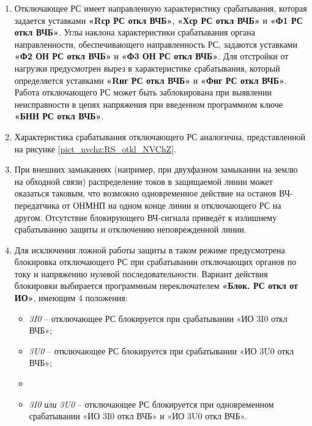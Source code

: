 \begin{enumerate}
\begin{enumerate}
\medskip

\item
Отключающее РС имеет направленную характеристику срабатывания, которая задается уставками \textbf{«Rср РС откл ВЧБ»}, \textbf{«Хср РС откл ВЧБ»} и \textbf{«Ф1 РС откл ВЧБ»}.
Углы наклона характеристики срабатывания органа направленности, обеспечивающего направленность РС, задаются уставками \textbf{«Ф2 ОН РС откл ВЧБ»} и \textbf{«Ф3 ОН РС откл ВЧБ»}.
Для отстройки от нагрузки предусмотрен вырез в характеристике срабатывания, который определяется уставками \textbf{«Rнг РС откл ВЧБ»} и \textbf{«Фнг РС откл ВЧБ»}. 
Работа отключающего РС может быть заблокирована при выявлении неисправности в цепях напряжения при введенном программном ключе \textbf{«БНН РС откл ВЧБ»}.

\item
Характеристика срабатывания отключающего РС аналогична, представленной на рисунке \ref{pict_nvchz:RS_otkl_NVChZ}.

%
%

\item
При внешних замыканиях (например, при двухфазном замыкании на землю на обходной связи) распределение токов в защищаемой линии может оказаться таковым, что возможно одновременное действие на останов ВЧ-передатчика от ОНМНП на одном конце линии и отключающего РС на другом.
Отсутствие блокирующего ВЧ-сигнала приведёт к излишнему срабатыванию защиты и отключению неповрежденной линии. 

\item
Для исключения ложной работы защиты в таком режиме предусмотрена блокировка отключающего РС при срабатывании отключающих органов по току и напряжению нулевой последовательности.
Вариант действия блокировки выбирается программным переключателем \textbf{«Блок. РС откл от ИО»}, имеющим 4 положения:
\begin{itemize} 
\item \textit{3I0} – отключающее РС блокируется при срабатывании «ИО 3I0 откл ВЧБ»;
\item \textit{3U0} – отключающее РС блокируется при срабатывании «ИО 3U0 откл ВЧБ»;
\item {}
\item \textit{3I0 или 3U0} – отключающее РС блокируется при одновременном срабатывании «ИО 3I0 откл ВЧБ» и «ИО 3U0 откл ВЧБ».
\end{itemize}


\end{enumerate}
\end{enumerate}
